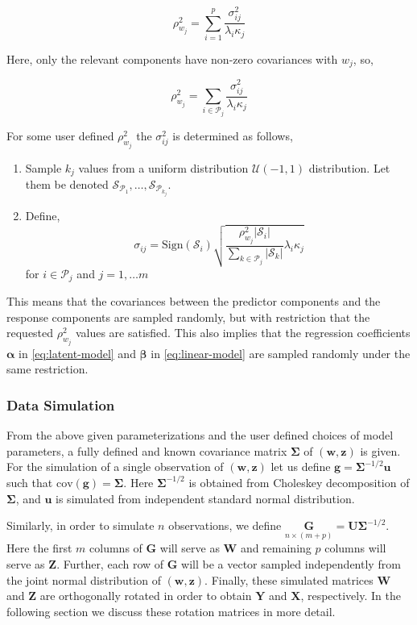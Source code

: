 \documentclass[review]{elsarticle}
\providecommand{\tightlist}{%
  \setlength{\itemsep}{0pt}\setlength{\parskip}{0pt}}
\theoremstyle{definition}
\theoremstyle{definition}
\theoremstyle{definition}
\theoremstyle{remark}
\begin{document}
\[
\rho_{w_j}^2 = \sum_{i = 1}^p\frac{\sigma_{ij}^2}{\lambda_i\kappa_j}
\]

Here, only the relevant components have non-zero covariances with
\(w_j\), so,

\[
\rho_{w_j}^2 = \sum_{i \in \mathcal{P}_j} \frac{\sigma_{ij}^2}{\lambda_i\kappa_j}
\]

For some user defined \(\rho_{w_j}^2\) the \(\sigma_{ij}^2\) is
determined as follows,

\begin{enumerate}
\def\labelenumi{\arabic{enumi}.}
\tightlist
\item
  Sample \(k_j\) values from a uniform distribution
  \(\mathcal{U}(-1, 1)\) distribution. Let them be denoted
  \(\mathcal{S}_{\mathcal{P}_1}, \ldots, \mathcal{S}_{\mathcal{P}_{k_j}}\).
\item
  Define,
  \[\sigma_{ij} = \text{Sign}(\mathcal{S}_i)\sqrt{\frac{\rho_{w_j}^2\left|\mathcal{S}_i\right|}{\sum_{k\in\mathcal{P}_j}\left|\mathcal{S}_k\right|}\lambda_i\kappa_j}\]
  for \(i \in \mathcal{P}_j\) and \(j = 1, \ldots m\)
\end{enumerate}

This means that the covariances between the predictor components and the
response components are sampled randomly, but with restriction that the
requested \(\rho_{w_j}^2\) values are satisfied. This also implies that
the regression coefficients \(\boldsymbol{\alpha}\) in
\eqref{eq:latent-model} and \(\boldsymbol{\beta}\) in
\eqref{eq:linear-model} are sampled randomly under the same restriction.

\subsubsection{Data Simulation}\label{data-simulation}

From the above given parameterizations and the user defined choices of
model parameters, a fully defined and known covariance matrix
\(\boldsymbol{\Sigma}\) of \((\mathbf{w, z})\) is given. For the
simulation of a single observation of \((\mathbf{w, z})\) let us define
\(\mathbf{g} = \boldsymbol{\Sigma}^{-1/2}\mathbf{u}\) such that
\(\text{cov}(\mathbf{g}) = \boldsymbol{\Sigma}\). Here
\(\boldsymbol{\Sigma}^{-1/2}\) is obtained from Choleskey decomposition
of \(\boldsymbol{\Sigma}\), and \(\mathbf{u}\) is simulated from
independent standard normal distribution.

Similarly, in order to simulate \(n\) observations, we define
\(\underset{n \times (m + p)}{\mathbf{G}} = \mathbf{U}\boldsymbol{\Sigma}^{-1/2}\).
Here the first \(m\) columns of \(\mathbf{G}\) will serve as
\(\mathbf{W}\) and remaining \(p\) columns will serve as \(\mathbf{Z}\).
Further, each row of \(\mathbf{G}\) will be a vector sampled
independently from the joint normal distribution of
\(\left(\mathbf{w}, \mathbf{z}\right)\). Finally, these simulated
matrices \(\mathbf{W}\) and \(\mathbf{Z}\) are orthogonally rotated in
order to obtain \(\mathbf{Y}\) and \(\mathbf{X}\), respectively. In the
following section we discuss these rotation matrices in more detail.
\end{document}
